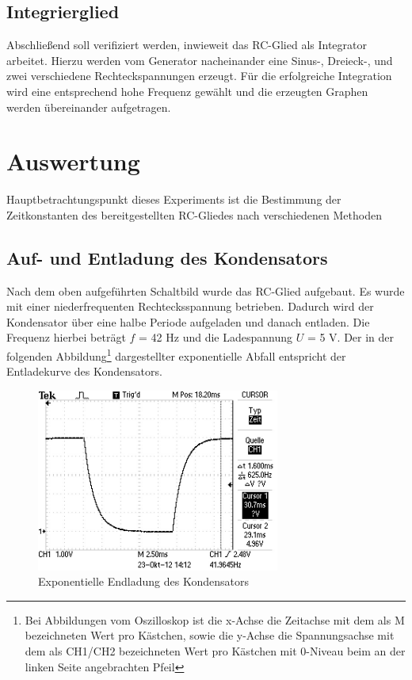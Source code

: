 \subsection{Integrierglied}
Abschließend soll verifiziert werden, inwieweit das RC-Glied als Integrator arbeitet. Hierzu werden vom Generator nacheinander eine Sinus-, Dreieck-, und zwei verschiedene Rechteckspannungen erzeugt. 
Für die erfolgreiche Integration wird eine entsprechend hohe Frequenz gewählt und die erzeugten Graphen werden übereinander aufgetragen.

\section{Auswertung}
Hauptbetrachtungspunkt dieses Experiments ist die Bestimmung der Zeitkonstanten des bereitgestellten RC-Gliedes nach verschiedenen Methoden

\subsection{Auf- und Entladung des Kondensators}
Nach dem oben aufgeführten Schaltbild wurde das RC-Glied aufgebaut. Es wurde mit einer niederfrequenten Rechtecksspannung betrieben.
Dadurch wird der Kondensator über eine halbe Periode aufgeladen und danach entladen. Die Frequenz hierbei beträgt $f$ = 42 Hz und die Ladespannung
$U$ = 5 V. Der in der folgenden Abbildung\footnote{Bei Abbildungen vom Oszilloskop ist die x-Achse die Zeitachse mit dem als M bezeichneten Wert pro Kästchen, sowie die y-Achse die Spannungsachse mit dem als CH1/CH2 bezeichneten Wert pro Kästchen mit 0-Niveau beim an der linken Seite angebrachten Pfeil} dargestellter exponentielle Abfall entspricht der Entladekurve des Kondensators.


\begin{figure}[H]
\includegraphics[width=8cm] {_pics/TEK0000.JPG}
\centering
\caption{Exponentielle Endladung des Kondensators }
\end{figure}


